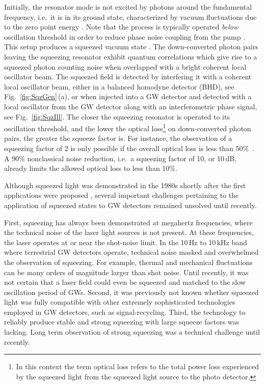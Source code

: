 Initially, the resonator mode is not excited by photons
around the fundamental frequency, i.e.\ it is in its ground state,
characterized by vacuum fluctuations due to the zero point energy
\cite{GerryKnight}. Note that the process is typically operated
\textit{below} oscillation threshold in order to reduce phase noise coupling
from the pump \cite{Reid1989}.  This setup produces a squeezed vacuum
state \cite{GerryKnight}. The down-converted photon pairs leaving the squeezing
resonator exhibit quantum correlations which give rise to a squeezed
photon counting noise when overlapped with a bright coherent local
oscillator beam. The squeezed field is detected by interfering it
with a coherent local oscillator beam, either in a balanced homodyne
detector (BHD), see Fig.~\ref{fig:SqzGen}\,(a), or when injected into a GW
detector and detected with a local oscillator from the GW detector
along with an interferometric phase signal, see Fig.~\ref{fig:SqzIll}. The closer
the squeezing resonator is operated to its oscillation threshold,
and the lower the optical loss\footnote{In this context the term optical
loss refers to the total power loss experienced by the squeezed light from the squeezed light source to the photo 
detector.} on down-converted photon pairs, the
greater the squeeze factor is. For instance, the observation of a
squeezing factor of 2
is only possible if the
overall optical loss is less than 50\%~\cite{BachorRalph2004}. A
90\% nonclassical noise reduction, i.e.\ a squeezing factor of 10, or
10\,dB, already limits the allowed optical loss to less
than 10\%.

Although squeezed light was demonstrated in the 1980s
shortly after the first applications were
proposed \cite{Slusher1985,Shelby1986,Wu1986}, several important challenges pertaining to the application of
squeezed states to GW detectors remained unsolved until recently.

First, squeezing has always been demonstrated at megahertz
frequencies, where the technical noise of the laser light sources is not present.  At these frequencies, the laser operates at or near the shot-noise limit.  In the 10\,Hz to
10\,kHz band where terrestrial GW detectors operate,
technical noise masked and overwhelmed the observation of squeezing.  For example,  thermal and mechanical 
fluctuations can be many orders of magnitude larger than shot noise.
Until recently, it was not certain that a laser field could even be squeezed and matched to the
slow oscillation period of GWs.
Second, it was previously not known whether squeezed light was fully
compatible with other extremely sophisticated technologies employed
in GW detectors, such as signal-recycling.
Third, the technology to reliably produce stable and strong
squeezing with large squeeze factors was lacking.  Long term observation of strong squeezing was a technical challenge until recently.

